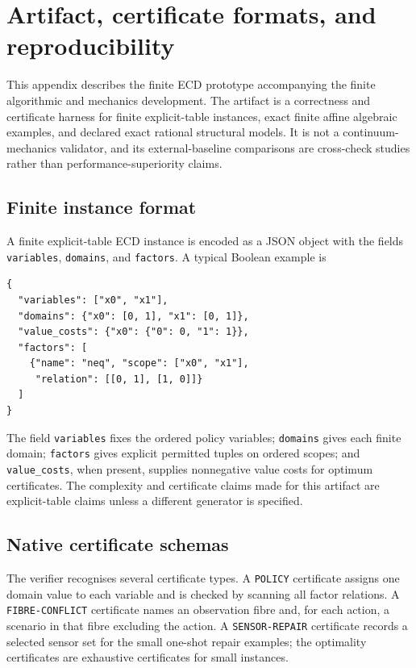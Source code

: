 \appendix
\section{Artifact, certificate formats, and reproducibility}
\label{app:artifact}

This appendix describes the finite ECD prototype accompanying the finite
algorithmic and mechanics development. The artifact is a correctness and
certificate harness for finite explicit-table instances, exact finite affine
algebraic examples, and declared exact rational structural models. It is not a
continuum-mechanics validator, and its external-baseline comparisons are
cross-check studies rather than performance-superiority claims.

\subsection{Finite instance format}

A finite explicit-table ECD instance is encoded as a JSON object with the fields
\texttt{variables}, \texttt{domains}, and \texttt{factors}. A typical Boolean
example is
\begin{verbatim}
{
  "variables": ["x0", "x1"],
  "domains": {"x0": [0, 1], "x1": [0, 1]},
  "value_costs": {"x0": {"0": 0, "1": 1}},
  "factors": [
    {"name": "neq", "scope": ["x0", "x1"],
     "relation": [[0, 1], [1, 0]]}
  ]
}
\end{verbatim}
The field \texttt{variables} fixes the ordered policy variables; \texttt{domains}
gives each finite domain; \texttt{factors} gives explicit permitted tuples on
ordered scopes; and \texttt{value\_costs}, when present, supplies nonnegative
value costs for optimum certificates. The complexity and certificate claims made
for this artifact are explicit-table claims unless a different generator is
specified.

\subsection{Native certificate schemas}

The verifier recognises several certificate types. A \texttt{POLICY} certificate
assigns one domain value to each variable and is checked by scanning all factor
relations. A \texttt{FIBRE-CONFLICT} certificate names an observation fibre and,
for each action, a scenario in that fibre excluding the action. A
\texttt{SENSOR-REPAIR} certificate records a selected sensor set for the small
one-shot repair examples; the optimality certificates are exhaustive
certificates for small instances.


